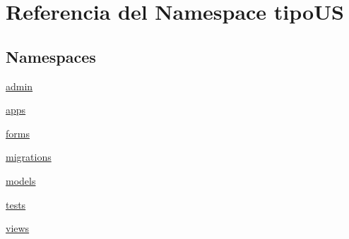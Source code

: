 \hypertarget{namespacetipo_u_s}{}\section{Referencia del Namespace tipo\+US}
\label{namespacetipo_u_s}
\subsection*{Namespaces}
\begin{DoxyCompactItemize}
\item 
 \hyperlink{namespacetipo_u_s_1_1admin}{admin}
\item 
 \hyperlink{namespacetipo_u_s_1_1apps}{apps}
\item 
 \hyperlink{namespacetipo_u_s_1_1forms}{forms}
\item 
 \hyperlink{namespacetipo_u_s_1_1migrations}{migrations}
\item 
 \hyperlink{namespacetipo_u_s_1_1models}{models}
\item 
 \hyperlink{namespacetipo_u_s_1_1tests}{tests}
\item 
 \hyperlink{namespacetipo_u_s_1_1views}{views}
\end{DoxyCompactItemize}

